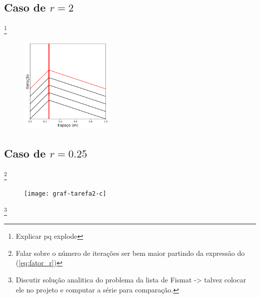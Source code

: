 \documentclass[a4paper, 11pt]{article}
\begin{document}
\subsection{Caso de \( r = 2 \) }


\footnote{Explicar pq explode}
\begin{figure}[h!] 
    \centering
    \centering
    \includegraphics[width=0.4\textwidth]{graf-tarefa2-b}
    \caption{}
    \label{fig:subB}
\end{figure}

\subsection{Caso de \( r = 0.25 \) }



\footnote{Falar sobre o número de iterações ser bem maior partindo da expressão do (\ref{eq:fator_r})}
\begin{figure}[h!] 
    \centering
    \centering
    \texttt{[image: graf-tarefa2-c]}
    \caption{}
    \label{fig:subC}
\end{figure}

\footnote{Discutir solução analitica do problema da lista de Fismat -> talvez colocar ele no projeto
  e computar a série para comparação.}
\end{document}
